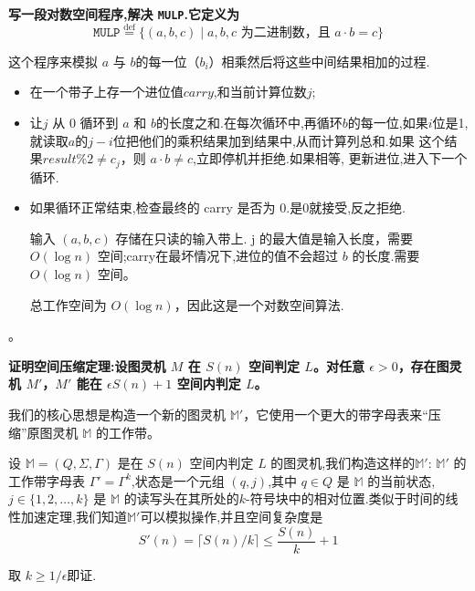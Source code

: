 \documentclass{homework}
\begin{document}
	\question \textbf{写一段对数空间程序,解决 \texttt{MULP}.它定义为\[
		\texttt{MULP} \overset{\text{def}}{=} \{ (a, b, c) \mid a, b, c \text{ 为二进制数，且 } a \cdot b = c \}
		\]}
	
	
	\begin{sol}

	这个程序来模拟 $a$ 与 $b$的每一位（$b_i$）相乘然后将这些中间结果相加的过程.
	\begin{itemize}
		\item 在一个带子上存一个进位值$carry$,和当前计算位数$j$;
		
		\item 让$j$ 从 0 循环到 $a$ 和 $b$的长度之和.在每次循环中,再循环$b$的每一位,如果$i$位是1,就读取$a$的$j-i$位把他们的乘积结果加到结果中,从而计算列总和.如果 这个结果$result \% 2 \neq c_j$，则 $a \cdot b \neq c$,立即停机并拒绝.如果相等, 更新进位,进入下一个循环.
		\item 如果循环正常结束,检查最终的 carry 是否为 0.是0就接受,反之拒绝.

		输入 $(a, b, c)$ 存储在只读的输入带上. j 的最大值是输入长度，需要 $O(\log n)$
		空间;carry在最坏情况下,进位的值不会超过 $b$
		的长度.需要 $O(\log n)$ 空间。

		总工作空间为 $O(\log n)$，因此这是一个对数空间算法.
	\end{itemize}
	。
	\end{sol}
	\question \textbf{证明空间压缩定理:设图灵机 $M$ 在 $S(n)$ 空间判定 $L$。对任意 $\epsilon > 0$，存在图灵机 $M'$，$M'$ 能在 $\epsilon S(n) + 1$ 空间内判定 $L$。}
	
	\begin{sol}
		我们的核心思想是构造一个新的图灵机
		$\mathbb{M}'$，它使用一个更大的带字母表来“压缩”原图灵机 $\mathbb{M}$ 的工作带。
		
		设 $\mathbb{M}= (Q, \Sigma, \Gamma)$ 是在
		$S(n)$ 空间内判定 $L$ 的图灵机,我们构造这样的$\mathbb{M}'$:
		$\mathbb{M}'$ 的工作带字母表  $\Gamma' =
		\Gamma^k$,状态是一个元组 $(q, j)$,其中 $q \in Q$ 是 $\mathbb{M}$ 的当前状态,$j \in \{1, 2, \dots, k\}$ 是 $\mathbb{M}$ 的读写头在其所处的$k$-符号块中的相对位置.类似于时间的线性加速定理,我们知道$\mathbb{M'}$可以模拟操作,并且空间复杂度是
	 $$ S'(n) = \lceil S(n)/k \rceil \le \frac{S(n)}{k} + 1 $$
	 
	取 $k \ge 1/\epsilon$即证.
	
		
	\end{sol}
	
\end{document}
